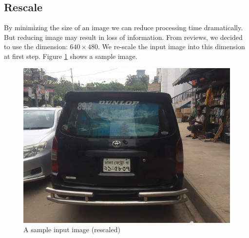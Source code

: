 \documentclass{standalone}
\begin{document}
\subsection{Rescale}
By minimizing the size of an image we can reduce processing time dramatically. But reducing image may result in loss of information. From reviews, we decided to use the dimension: $640 \times 480$. We re-scale the input image into this dimension at first step. Figure \ref{fig:RescaledSample} shows a sample image.

\begin{figure}
	\centering
	\includegraphics[width=.8\linewidth]{./img/sample/stage0.jpg}
	\caption{A sample input image (rescaled)}
	\label{fig:RescaledSample}
\end{figure}
\end{document}
